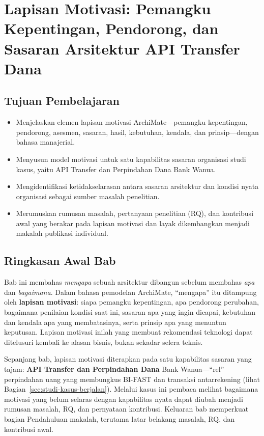 \chapter[Lapisan Motivasi: Pemangku Kepentingan, Pendorong, dan Sasaran]{Lapisan
Motivasi: Pemangku Kepentingan, Pendorong, dan Sasaran Arsitektur API Transfer
Dana}
\label{ch:strategi-bisnis}



\section*{Tujuan Pembelajaran}
\begin{itemize}
  \item Menjelaskan elemen lapisan motivasi ArchiMate---pemangku kepentingan,
        pendorong, asesmen, sasaran, hasil, kebutuhan, kendala, dan
        prinsip---dengan bahasa manajerial.
  \item Menyusun model motivasi untuk satu kapabilitas sasaran organisasi studi
        kasus, yaitu API Transfer dan Perpindahan Dana Bank Wanua.
  \item Mengidentifikasi ketidakselarasan antara sasaran arsitektur dan kondisi
        nyata organisasi sebagai sumber masalah penelitian.
  \item Merumuskan rumusan masalah, pertanyaan penelitian (RQ), dan kontribusi
        awal yang berakar pada lapisan motivasi dan layak dikembangkan menjadi
        makalah publikasi individual.
\end{itemize}


\section{Ringkasan Awal Bab}

Bab ini membahas \emph{mengapa} sebuah arsitektur dibangun sebelum membahas
\emph{apa} dan \emph{bagaimana}. Dalam bahasa pemodelan ArchiMate, ``mengapa''
itu ditampung oleh \textbf{lapisan motivasi}: siapa pemangku kepentingan, apa
pendorong perubahan, bagaimana penilaian kondisi saat ini, sasaran apa yang
ingin dicapai, kebutuhan dan kendala apa yang membatasinya, serta prinsip apa
yang menuntun keputusan. Lapisan motivasi inilah yang membuat rekomendasi
teknologi dapat ditelusuri kembali ke alasan bisnis, bukan sekadar selera
teknis.

Sepanjang bab, lapisan motivasi diterapkan pada satu kapabilitas sasaran yang
tajam: \textbf{API Transfer dan Perpindahan Dana} Bank Wanua---``rel''
perpindahan uang yang membungkus BI-FAST dan transaksi antarrekening (lihat
Bagian~\ref{sec:studi-kasus-berjalan}). Melalui kasus ini pembaca melihat
bagaimana motivasi yang belum selaras dengan kapabilitas nyata dapat diubah
menjadi rumusan masalah, RQ, dan pernyataan kontribusi. Keluaran bab memperkuat
bagian Pendahuluan makalah, terutama latar belakang masalah, RQ, dan kontribusi
awal.


